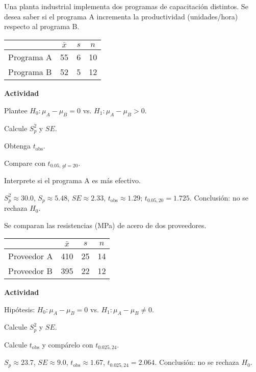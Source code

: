 \begin{ejercicio}
Una planta industrial implementa dos programas de capacitación distintos. Se desea saber si el programa A incrementa la productividad (unidades/hora) respecto al programa B.

\begin{center}
\begin{tabular}{@{}lccc@{}}
\toprule
 & $\bar{x}$ & $s$ & $n$ \\
\midrule
Programa A & 55 & 6 & 10 \\
Programa B & 52 & 5 & 12 \\
\bottomrule
\end{tabular}
\end{center}

\textbf{Actividad}
\begin{pasos}
  \item Plantee $H_0:\mu_A-\mu_B=0$ vs. $H_1:\mu_A-\mu_B>0$.
  \item Calcule $S_p^2$ y $SE$.
  \item Obtenga $t_{\text{obs}}$.
  \item Compare con $t_{0.05,\,gl=20}$.
  \item Interprete si el programa A es más efectivo.
\end{pasos}

\begin{clave}
$S_p^2\approx30.0$, $S_p\approx5.48$, $SE\approx2.33$, $t_{\text{obs}}\approx1.29$; $t_{0.05,20}=1.725$.
Conclusión: no se rechaza $H_0$.
\end{clave}
\end{ejercicio}

\begin{ejercicio}
Se comparan las resistencias (MPa) de acero de dos proveedores.

\begin{center}
\begin{tabular}{@{}lccc@{}}
\toprule
 & $\bar{x}$ & $s$ & $n$ \\
\midrule
Proveedor A & 410 & 25 & 14 \\
Proveedor B & 395 & 22 & 12 \\
\bottomrule
\end{tabular}
\end{center}

\textbf{Actividad}
\begin{pasos}
  \item Hipótesis: $H_0:\mu_A-\mu_B=0$ vs. $H_1:\mu_A-\mu_B\neq0$.
  \item Calcule $S_p^2$ y $SE$.
  \item Calcule $t_{\text{obs}}$ y compárelo con $t_{0.025,24}$.
\end{pasos}

\begin{clave}
$S_p\approx23.7$, $SE\approx9.0$, $t_{\text{obs}}\approx1.67$, $t_{0.025,24}=2.064$.
Conclusión: no se rechaza $H_0$.
\end{clave}
\end{ejercicio}

